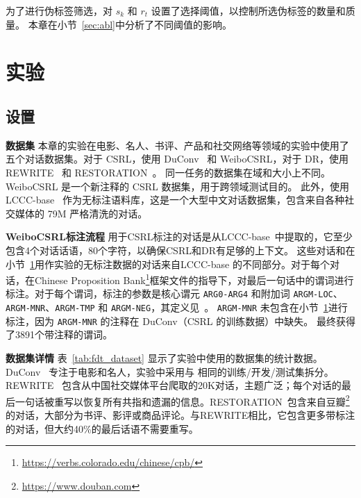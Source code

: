 为了进行伪标签筛选，对 $s_k$ 和 $r_t$ 设置了选择阈值，以控制所选伪标签的数量和质量。 本章在小节~\ref{sec:abl}中分析了不同阈值的影响。

\section{实验}\label{sec:fdt_exp}
\subsection{设置}
\noindent\textbf{数据集 } 本章的实验在电影、名人、书评、产品和社交网络等领域的实验中使用了五个对话数据集。对于 CSRL，使用 DuConv~\cite{xu2021conversational} 和 WeiboCSRL，对于 DR，使用 REWRITE~\cite{su2019improving} 和 RESTORATION~\cite{pan2019improving}。 同一任务的数据集在域和大小上不同。 WeiboCSRL 是一个新注释的 CSRL 数据集，用于跨领域测试目的。 此外，使用 LCCC-base~\cite{wang2020large} 作为无标注语料库，这是一个大型中文对话数据集，包含来自各种社交媒体的 79M 严格清洗的对话。

\noindent\textbf{WeiboCSRL标注流程 } 用于CSRL标注的对话是从LCCC-base~\cite{wang2020large}中提取的，它至少包含4个对话话语，80个字符，以确保CSRL和DR有足够的上下文。 这些对话和在小节~\ref{sec:fdt_exp}用作实验的无标注数据的对话来自LCCC-base 的不同部分。对于每个对话，在Chinese Proposition Bank\footnote{\url{https://verbs.colorado.edu/chinese/cpb/}}框架文件的指导下，对最后一句话中的谓词进行标注。对于每个谓词，标注的参数是核心谓元 \texttt{ARG0-ARG4} 和附加词 \texttt{ARGM-LOC}、\texttt{ARGM-MNR}、\texttt{ARGM-TMP} 和 \texttt{ARGM-NEG}，其定义见~\cite{xue2006semantic}。 \texttt{ARGM-MNR} 未包含在小节~\ref{sec:fdt_exp}进行标注，因为 \texttt{ARGM-MNR} 的注释在 DuConv（CSRL 的训练数据）中缺失。 最终获得了3891个带注释的谓词。

\noindent\textbf{数据集详情 } 表~\ref{tab:fdt_dataset} 显示了实验中使用的数据集的统计数据。 DuConv~\cite{xu2021conversational} 专注于电影和名人，实验中采用与 \citet{xu2021conversational} 相同的训练/开发/测试集拆分。 REWRITE~\cite{su2019improving} 包含从中国社交媒体平台爬取的20K对话，主题广泛；每个对话的最后一句话被重写以恢复所有共指和遗漏的信息。RESTORATION~\cite{pan2019improving}包含来自豆瓣\footnote{\url{https://www.douban.com}}的对话，大部分为书评、影评或商品评论。与REWRITE相比，它包含更多带标注的对话，但大约40\%的最后话语不需要重写。
\begin{table}[!ht]
    \centering
    \caption{数据集统计信息。}
    \label{tab:fdt_dataset}
\end{table}

